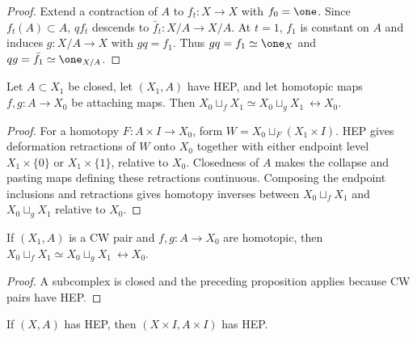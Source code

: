 \begin{proof}
\leanok
\sketch Extend a contraction of $A$ to $f_t:X\to X$ with $f_0=\one$. Since
$f_t(A)\subset A$, $qf_t$ descends to $\bar f_t:X/A\to X/A$. At $t=1$, $f_1$
is constant on $A$ and induces $g:X/A\to X$ with $gq=f_1$. Thus
$gq=f_1\simeq\one_X$ and $qg=\bar f_1\simeq\one_{X/A}$.
\end{proof}

\begin{lemma}
\label{lem:attach-homotopic-hep-rel}
\leanok
{}
Let $A\subset X_1$ be closed, let $(X_1,A)$ have HEP, and let homotopic maps
$f,g:A\to X_0$ be attaching maps. Then
$X_0\sqcup_fX_1\simeq X_0\sqcup_gX_1\ \rel X_0$.
\end{lemma}

\begin{proof}
\leanok
\sketch For a homotopy $F:A\times I\to X_0$, form
$W=X_0\sqcup_F(X_1\times I)$. HEP gives deformation retractions of $W$ onto
$X_0$ together with either endpoint level $X_1\times\{0\}$ or
$X_1\times\{1\}$, relative to $X_0$. Closedness of $A$ makes the collapse and
pasting maps defining these retractions continuous. Composing the endpoint
inclusions and retractions gives homotopy inverses between
$X_0\sqcup_fX_1$ and $X_0\sqcup_gX_1$ relative to $X_0$.
\end{proof}

\begin{proposition}
\label{prop:attaching-maps-homotopic-rel-x0}
\leanok
{}
If $(X_1,A)$ is a CW pair and $f,g:A\to X_0$ are homotopic, then
$X_0\sqcup_fX_1\simeq X_0\sqcup_gX_1\ \rel X_0$.
\end{proposition}

\begin{proof}
\leanok
\sketch A subcomplex is closed and the preceding proposition applies because CW
pairs have HEP.
\end{proof}

\begin{lemma}
\label{lem:hep-product-interval}
\leanok
{}
If $(X,A)$ has HEP, then $(X\times I,A\times I)$ has HEP.
\end{lemma}

